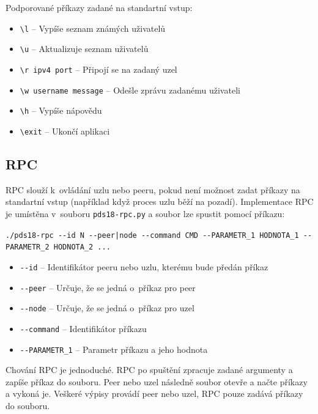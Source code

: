 \documentclass[11pt,a4paper,titlepage]{article}
\begin{document}
            Podporované příkazy zadané na standartní vstup:
            \begin{itemize}
                \item \verb+\l+ -- Vypíše seznam známých uživatelů
                \item \verb+\u+ -- Aktualizuje seznam uživatelů
                \item \verb+\r ipv4 port+ -- Připojí se na zadaný uzel
                \item \verb+\w username message+ -- Odešle zprávu zadanému uživateli
                \item \verb+\h+ -- Vypíše nápovědu
                \item \verb+\exit+ -- Ukončí aplikaci
            \end{itemize}
        \subsection{RPC}
            RPC slouží k~ovládání uzlu nebo peeru, pokud není možnost zadat příkazy na standartní vstup (například když proces uzlu běží na pozadí).
            Implementace RPC je umístěna v~souboru \texttt{pds18-rpc.py} a soubor lze spustit pomocí příkazu:

            \verb+./pds18-rpc --id N --peer|node --command CMD --PARAMETR_1 HODNOTA_1 --PARAMETR_2 HODNOTA_2 ...+
            \begin{itemize}
                \item \verb+--id+ -- Identifikátor peeru nebo uzlu, kterému bude předán příkaz
                \item \verb+--peer+ -- Určuje, že se jedná o~příkaz pro peer
                \item \verb+--node+ -- Určuje, že se jedná o~příkaz pro uzel
                \item \verb+--command+ -- Identifikátor příkazu
                \item \verb+--PARAMETR_1+ -- Parametr příkazu a jeho hodnota
            \end{itemize}

            Chování RPC je jednoduché. RPC po spuštění zpracuje zadané argumenty a zapíše příkaz do souboru. Peer nebo uzel
            následně soubor otevře a načte příkazy a vykoná je. Veškeré výpisy provádí peer nebo uzel, RPC pouze zadává
            příkazy do souboru.
\end{document}
